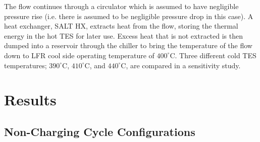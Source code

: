 \begin{paracol}{2}
\linenumbers
\switchcolumn

The flow continues through a circulator which is assumed to have negligible pressure rise (i.e. there is assumed to be negligible pressure drop in this case). A heat exchanger, SALT HX, extracts heat from the flow, storing the thermal energy in the hot TES for later use. Excess heat that is not extracted is then dumped into a reservoir through the chiller to bring the temperature of the flow down to LFR cool side operating temperature of $400^{\circ}$C. Three different cold TES temperatures; $390^{\circ}$C, $410^{\circ}$C, and $440^{\circ}$C, are compared in a sensitivity study. 



\section{Results}


\subsection{Non-Charging Cycle Configurations}


\end{paracol}
